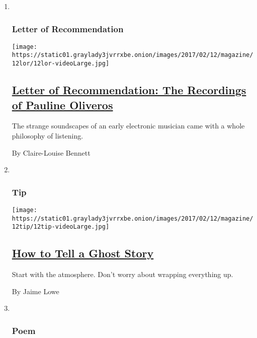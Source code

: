 \begin{enumerate}
\def\labelenumi{\arabic{enumi}.}
\item ~
  \hypertarget{letter-of-recommendation}{%
  \subsubsection{Letter of
  Recommendation}\label{letter-of-recommendation}}

  \texttt{[image: https://static01.graylady3jvrrxbe.onion/images/2017/02/12/magazine/12lor/12lor-videoLarge.jpg]}

  \hypertarget{letter-of-recommendation-the-recordings-of-pauline-oliveros}{%
  \subsection{\texorpdfstring{\href{/2017/02/09/magazine/letter-of-recommendation-the-recordings-of-pauline-oliveros.html}{Letter
  of Recommendation: The Recordings of Pauline
  Oliveros}}{Letter of Recommendation: The Recordings of Pauline Oliveros}}\label{letter-of-recommendation-the-recordings-of-pauline-oliveros}}

  The strange soundscapes of an early electronic musician came with a
  whole philosophy of listening.

  By Claire-Louise Bennett
\item ~
  \hypertarget{tip}{%
  \subsubsection{Tip}\label{tip}}

  \texttt{[image: https://static01.graylady3jvrrxbe.onion/images/2017/02/12/magazine/12tip/12tip-videoLarge.jpg]}

  \hypertarget{how-to-tell-a-ghost-story}{%
  \subsection{\texorpdfstring{\href{/2017/02/10/magazine/how-to-tell-a-ghost-story.html}{How
  to Tell a Ghost
  Story}}{How to Tell a Ghost Story}}\label{how-to-tell-a-ghost-story}}

  Start with the atmosphere. Don't worry about wrapping everything up.

  By Jaime Lowe
\item ~
  \hypertarget{poem}{%
  \subsubsection{Poem}\label{poem}}


\end{enumerate}

